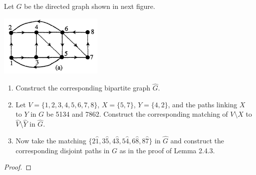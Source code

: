 \prob
{
    Let $G$ be the directed graph shown in next figure.
            \begin{center}
                \includegraphics[width=5cm]{Test2/Problem12/DirectedGraphs.png}
            \end{center}\pn
    
    \begin{enumerate}[label=(\roman*)]
        \item   Construct the corresponding bipartite graph $\hat{G}$.
        \item   Let $V = \{1,2,3,4,5,6,7,8\}$, $X=\{5,7\}$, $Y=\{4,2\}$,
                and the paths linking $X$ to $Y$ in $G$ be 5134 and 7862. Construct the
                corresponding matching of $V \setminus X$ to $\hat{V} \setminus \hat{Y}$ in $\hat{G}$.
        \item   Now take the matching $\{2\hat{1}, 3\hat{5}, 4\hat{3}, 5\hat{4}, 6\hat{8}, 8\hat{7}\}$ in $\hat{G}$ and 
                construct the corresponding disjoint paths in $G$ as in the proof of Lemma 2.4.3.
    \end{enumerate}
}
\begin{proof}
\end{proof}